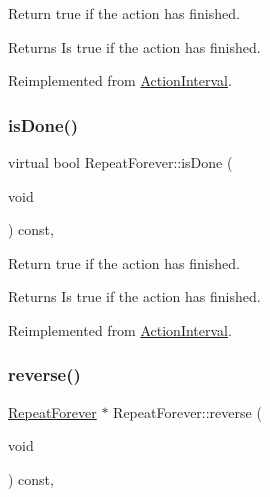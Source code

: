 Return true if the action has finished.

\begin{DoxyReturn}{Returns}
Is true if the action has finished. 
\end{DoxyReturn}


Reimplemented from \hyperlink{classActionInterval_a466ff6a3a5f95e47d4d01bfa4775290d}{Action\+Interval}.

\mbox{\label{classRepeatForever_a5bae9a12b19d0c39d2a8a416bc68b1db}} 
\subsubsection{\texorpdfstring{is\+Done()}{isDone()}\hspace{0.1cm}{\footnotesize\ttfamily [2/2]}}
{\footnotesize\ttfamily virtual bool Repeat\+Forever\+::is\+Done (\begin{DoxyParamCaption}\item[{void}]{ }\end{DoxyParamCaption}) const\hspace{0.3cm}{\ttfamily [override]}, {\ttfamily [virtual]}}

Return true if the action has finished.

\begin{DoxyReturn}{Returns}
Is true if the action has finished. 
\end{DoxyReturn}


Reimplemented from \hyperlink{classActionInterval_a466ff6a3a5f95e47d4d01bfa4775290d}{Action\+Interval}.

\mbox{\label{classRepeatForever_a83185ebb621d7dd7363b3b315170665e}} 
\subsubsection{\texorpdfstring{reverse()}{reverse()}\hspace{0.1cm}{\footnotesize\ttfamily [1/2]}}
{\footnotesize\ttfamily \hyperlink{classRepeatForever}{Repeat\+Forever} $\ast$ Repeat\+Forever\+::reverse (\begin{DoxyParamCaption}\item[{void}]{ }\end{DoxyParamCaption}) const\hspace{0.3cm}{\ttfamily [override]}, {\ttfamily [virtual]}}

